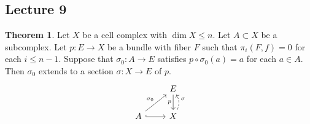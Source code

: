 \documentclass[10pt,letterpaper,cm]{nupset}
\theoremstyle{definition}
\theoremstyle{theorem}
\newtheorem{theorem}[defn]{Theorem}
\theoremstyle{remark}
\newcommand{\1}{\mathbb{1}}
\newcommand{\0}{\vec 0}
\begin{document}
\subsection{Lecture 9}

\begin{theorem}\label{ext}
Let $X$ be a cell complex with $\dim{X} \leq n$. Let $A \subset X$ be a subcomplex. Let $p: E \to X$ be a bundle with fiber $F$ such that $\pi_i\left(F, f\right) =0$ for each $i \leq n-1$. Suppose that $\sigma_0 : A \to E$ satisfies $p\circ \sigma_0(a) = a$ for each $a\in A$. Then $\sigma_0$ extends to a section $\sigma : X \to E$ of $p$.
\[
\begin{tikzcd}
                                         & E \arrow[d, "p"']                          \\
A \arrow[ru, "\sigma_0"] \arrow[r, hook] & X \arrow[u, "\sigma"', dashed, bend right]
\end{tikzcd}
\]
\end{theorem}
\end{document}
